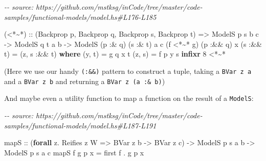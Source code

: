 \documentclass[]{article}
\newenvironment{Shaded}{}{}
\newcommand{\CommentTok}[1]{\textcolor[rgb]{0.38,0.63,0.69}{\textit{#1}}}
\newcommand{\DataTypeTok}[1]{\textcolor[rgb]{0.56,0.13,0.00}{#1}}
\newcommand{\DecValTok}[1]{\textcolor[rgb]{0.25,0.63,0.44}{#1}}
\newcommand{\KeywordTok}[1]{\textcolor[rgb]{0.00,0.44,0.13}{\textbf{#1}}}
\newcommand{\NormalTok}[1]{#1}
\newcommand{\OperatorTok}[1]{\textcolor[rgb]{0.40,0.40,0.40}{#1}}
\newcommand{\OtherTok}[1]{\textcolor[rgb]{0.00,0.44,0.13}{#1}}
\begin{document}
\begin{Shaded}
\begin{Highlighting}[]
\CommentTok{{-}{-} source: https://github.com/mstksg/inCode/tree/master/code{-}samples/functional{-}models/model.hs\#L176{-}L185}

\NormalTok{(}\OperatorTok{\textless{}*\textasciitilde{}*}\NormalTok{)}
\OtherTok{  ::}\NormalTok{ (}\DataTypeTok{Backprop}\NormalTok{ p, }\DataTypeTok{Backprop}\NormalTok{ q, }\DataTypeTok{Backprop}\NormalTok{ s, }\DataTypeTok{Backprop}\NormalTok{ t)}
    \OtherTok{=\textgreater{}} \DataTypeTok{ModelS}\NormalTok{  p        s       b c}
    \OtherTok{{-}\textgreater{}} \DataTypeTok{ModelS}\NormalTok{       q        t  a b}
    \OtherTok{{-}\textgreater{}} \DataTypeTok{ModelS}\NormalTok{ (p }\OperatorTok{:\&}\NormalTok{ q) (s }\OperatorTok{:\&}\NormalTok{ t) a c}
\NormalTok{(f }\OperatorTok{\textless{}*\textasciitilde{}*}\NormalTok{ g) (p }\OperatorTok{:\&\&}\NormalTok{ q) x (s }\OperatorTok{:\&\&}\NormalTok{ t) }\OtherTok{=}\NormalTok{ (z, s\textquotesingle{} }\OperatorTok{:\&\&}\NormalTok{ t\textquotesingle{})}
  \KeywordTok{where}
\NormalTok{    (y, t\textquotesingle{}) }\OtherTok{=}\NormalTok{ g q x t}
\NormalTok{    (z, s\textquotesingle{}) }\OtherTok{=}\NormalTok{ f p y s}
\KeywordTok{infixr} \DecValTok{8} \OperatorTok{\textless{}*\textasciitilde{}*}
\end{Highlighting}
\end{Shaded}

(Here we use our handy \texttt{(:\&\&)} pattern to construct a tuple, taking a
\texttt{BVar\ z\ a} and a \texttt{BVar\ z\ b} and returning a
\texttt{BVar\ z\ (a\ :\&\ b)})

And maybe even a utility function to map a function on the result of a
\texttt{ModelS}:

\begin{Shaded}
\begin{Highlighting}[]
\CommentTok{{-}{-} source: https://github.com/mstksg/inCode/tree/master/code{-}samples/functional{-}models/model.hs\#L187{-}L191}

\NormalTok{mapS}
\OtherTok{    ::}\NormalTok{ (}\KeywordTok{forall}\NormalTok{ z}\OperatorTok{.} \DataTypeTok{Reifies}\NormalTok{ z }\DataTypeTok{W} \OtherTok{=\textgreater{}} \DataTypeTok{BVar}\NormalTok{ z b }\OtherTok{{-}\textgreater{}} \DataTypeTok{BVar}\NormalTok{ z c)}
    \OtherTok{{-}\textgreater{}} \DataTypeTok{ModelS}\NormalTok{ p s a b}
    \OtherTok{{-}\textgreater{}} \DataTypeTok{ModelS}\NormalTok{ p s a c}
\NormalTok{mapS f g p x }\OtherTok{=}\NormalTok{ first f }\OperatorTok{.}\NormalTok{ g p x}
\end{Highlighting}
\end{Shaded}
\end{document}
